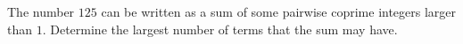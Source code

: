 The number $125$ can be written as a sum of some pairwise coprime integers larger than $1$. Determine the largest number of terms that the sum may have.